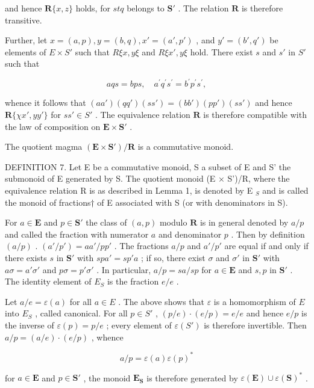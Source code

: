and hence \(\mathbf{R}\{x, z\}\) holds, for \(stq\) belongs to \(\mathbf{S}'\) . The relation \(\mathbf{R}\) is therefore transitive.

Further, let \(x = (a, p), y = (b, q), x' = (a', p')\) , and \(y' = (b', q')\) be elements of \(E \times S'\) such that \(R\xi x, y\xi\) and \(R\xi x', y\xi\) hold. There exist \(s\) and \(s'\) in \(S'\) such that

\[
a q s = b p s, \quad a ^ {\prime} q ^ {\prime} s ^ {\prime} = b ^ {\prime} p ^ {\prime} s ^ {\prime},
\]

whence it follows that \((aa')(qq')(ss') = (bb')(pp')(ss')\) and hence \(\mathbf{R}\{\chi x', yy'\}\) for \(ss' \in S'\) . The equivalence relation \(\mathbf{R}\) is therefore compatible with the law of composition on \(\mathbf{E} \times \mathbf{S}'\) .

The quotient magma \((\mathbf{E} \times \mathbf{S}')/\mathbf{R}\) is a commutative monoid.

DEFINITION 7. Let E be a commutative monoid, S a subset of E and S' the submonoid of E generated by S. The quotient monoid (E × S')/R, where the equivalence relation R is as described in Lemma 1, is denoted by E \(_{S}\) and is called the monoid of fractions† of E associated with S (or with denominators in S).

For \(a \in \mathbf{E}\) and \(p \in \mathbf{S}'\) the class of \((a, p)\) modulo \(\mathbf{R}\) is in general denoted by \(a/p\) and called the fraction with numerator \(a\) and denominator \(p\) . Then by definition \((a/p)\) . \((a'/p') = aa'/pp'\) . The fractions \(a/p\) and \(a'/p'\) are equal if and only if there exists \(s\) in \(\mathbf{S}'\) with \(spa' = sp'a\) ; if so, there exist \(\sigma\) and \(\sigma'\) in \(\mathbf{S}'\) with \(a\sigma = a'\sigma'\) and \(p\sigma = p'\sigma'\) . In particular, \(a/p = sa/sp\) for \(a \in \mathbf{E}\) and \(s, p\) in \(\mathbf{S}'\) . The identity element of \(E_S\) is the fraction \(e/e\) .

Let \(a / e = \varepsilon(a)\) for all \(a \in E\) . The above shows that \(\varepsilon\) is a homomorphism of \(E\) into \(E_S\) , called canonical. For all \(p \in S'\) , \((p / e) \cdot (e / p) = e / e\) and hence \(e / p\) is the inverse of \(\varepsilon(p) = p / e\) ; every element of \(\varepsilon(S')\) is therefore invertible. Then \(a / p = (a / e) \cdot (e / p)\) , whence

\[
a / p = \varepsilon (a) \varepsilon (p) ^ {*}\tag{1}
\]

for \(a \in \mathbf{E}\) and \(p \in \mathbf{S}'\) , the monoid \(\mathbf{E}_{\mathbf{S}}\) is therefore generated by \(\varepsilon(\mathbf{E}) \cup \varepsilon(\mathbf{S})^*\) .

